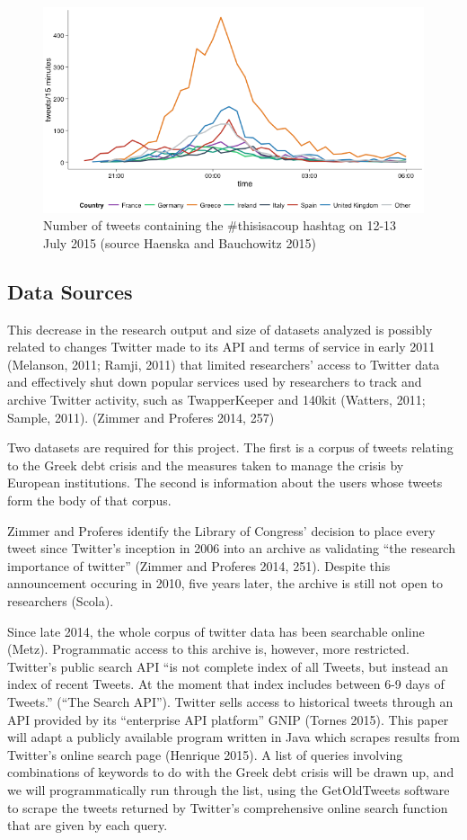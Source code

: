 \documentclass[]{article}
\begin{document}
\begin{figure}[htbp]
\centering
\includegraphics{img/Greece-twitter-2.png}
\caption{Number of tweets containing the \#thisisacoup hashtag on 12-13
July 2015 (source Haenska and Bauchowitz 2015)}
\end{figure}

\subsection{Data Sources}\label{data-sources}

This decrease in the research output and size of datasets analyzed is
possibly related to changes Twitter made to its API and terms of service
in early 2011 (Melanson, 2011; Ramji, 2011) that limited researchers'
access to Twitter data and effectively shut down popular services used
by researchers to track and archive Twitter activity, such as
TwapperKeeper and 140kit (Watters, 2011; Sample, 2011). (Zimmer and
Proferes 2014, 257)

Two datasets are required for this project. The first is a corpus of
tweets relating to the Greek debt crisis and the measures taken to
manage the crisis by European institutions. The second is information
about the users whose tweets form the body of that corpus.

Zimmer and Proferes identify the Library of Congress' decision to place
every tweet since Twitter's inception in 2006 into an archive as
validating ``the research importance of twitter'' (Zimmer and Proferes
2014, 251). Despite this announcement occuring in 2010, five years
later, the archive is still not open to researchers (Scola).

Since late 2014, the whole corpus of twitter data has been searchable
online (Metz). Programmatic access to this archive is, however, more
restricted. Twitter's public search API ``is not complete index of all
Tweets, but instead an index of recent Tweets. At the moment that index
includes between 6-9 days of Tweets.'' (``The Search API''). Twitter
sells access to historical tweets through an API provided by its
``enterprise API platform'' GNIP (Tornes 2015). This paper will adapt a
publicly available program written in Java which scrapes results from
Twitter's online search page (Henrique 2015). A list of queries
involving combinations of keywords to do with the Greek debt crisis will
be drawn up, and we will programmatically run through the list, using
the GetOldTweets software to scrape the tweets returned by Twitter's
comprehensive online search function that are given by each query.
\end{document}
